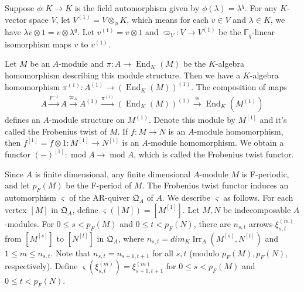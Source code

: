 \documentclass[12pt]{amsart}
\begin{document}
Suppose $\phi :K\rightarrow K$ is the field automorphism given by $\phi(\lambda) = \lambda^q$.
For any $K$-vector space $V$, let $V^{(1)} = V\otimes_{\phi} K$, which means for each $v\in V$ and $\lambda \in K$, we have $\lambda v \otimes 1 = v\otimes \lambda^q$.
Let $v^{(1)} = v\otimes 1$ and $\varpi_V:V\rightarrow V^{(1)}$ be the $\mathbb{F}_q$-linear isomorphism maps $v$ to $v^{(1)}$.

Let $M$ be an $A$-module and $\pi : A \rightarrow \operatorname{End}_K(M)$ be the $K$-algebra homomorphism describing this module structure.
Then we have a $K$-algebra homomorphism $\pi^{(1)}:A^{(1)}\rightarrow (\operatorname{End}_K(M))^{(1)}$.
The composition of maps
\begin{align*}
    A\xrightarrow{F^{-1}} A \xrightarrow{\varpi_A} A^{(1)} \xrightarrow{\pi^{(1)}} (\operatorname{End}_K(M))^{(1)} \xrightarrow{\cong} \operatorname{End}_K(M^{(1)}) 
\end{align*}
defines an $A$-module structure on $M^{(1)}$.
 Denote this module by $M^{[1]}$ and it's called the Frobenius twist of $M$.
If $f:M\rightarrow N$ is an $A$-module homomorphism, then $f^{[1]} = f \otimes 1 : M^{[1]} \rightarrow N^{[1]}$ is an $A$-module homomorphism.
We obtain a functor $(-)^{[1]}: \operatorname{mod}A \rightarrow \operatorname{mod}A$, which is called the Frobenius twist functor.


Since $A$ is finite dimensional, any finite dimensional $A$-module $M$ is F-periodic, and let $p_F(M)$ be the F-period of $M$.
The Frobenius twist functor induces an automorphism $\varsigma $ of the AR-quiver $ \mathfrak{Q}_A$ of $A$.
We describe $\varsigma $ as follows.
For each vertex $[M]$ in $\mathfrak{Q}_A$, define $\varsigma([M]) = [M^{[1]}]$.
Let $M,N$ be indecomposable $A$-modules.
For $0 \leq s < p_F(M)$ and $0\leq t < p_F(N)$, %
  there are $n_{s,t}$ arrows $\xi_{s,t}^{(m)} $ from $[M^{[s]}]$ to $[N^{[t]}]$ in $\mathfrak{Q}_A$, where $n_{s,t} = dim_K \operatorname{Irr}_A(M^{[s]},N^{[t]})$ and $1\leq m \leq n_{s,t}$.
Note that $n_{s,t} = n_{s+1,t+1}$ for all $s,t$ (modulo $p_F(M),p_F(N)$, respectively).
Define $\varsigma (\xi_{s,t}^{(m)}) = \xi_{s+1,t+1}^{(m)}$ for $0 \leq s < p_F(M)$ and $0\leq t < p_F(N)$.
\end{document}
